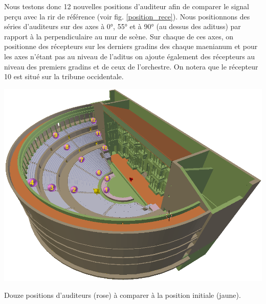 Nous testons donc 12 nouvelles positions d'auditeur afin de comparer le signal perçu avec la \gls{rir} de référence (voir fig. \ref{position_rece}). Nous positionnons des séries d'auditeurs sur des axes à 0°, 55° et à 90° (au dessus des \glspl{aditus}) par rapport à la perpendiculaire au mur de scène. Sur chaque de ces axes, on positionne des récepteurs sur les derniers gradins des chaque \gls{maenianum} et pour les axes n'étant pas au niveau de l'\gls{aditus} on ajoute également des récepteurs au niveau des premiers gradins et de ceux de l'orchestre. On notera que le récepteur 10 est situé sur la tribune occidentale.
\begin{figureth}
	\includegraphics[width=\linewidth]{images/position_rece}
	\caption{Douze positions d'auditeurs (rose) à comparer à la position initiale (jaune).}
	\label{position_rece}
\end{figureth}
%
